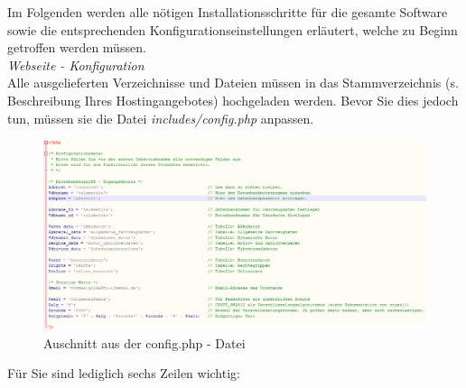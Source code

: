 \documentclass[fontsize = 12pt, paper = a4]{scrreprt}
\begin{document}
Im Folgenden werden alle nötigen Installationsschritte für die gesamte Software sowie die entsprechenden Konfigurationseinstellungen erläutert, welche zu Beginn getroffen werden müssen. \\

\textit{Webseite - Konfiguration} \\

Alle ausgelieferten Verzeichnisse und Dateien müssen in das Stammverzeichnis (s. Beschreibung Ihres Hostingangebotes) hochgeladen werden. Bevor Sie dies jedoch tun, müssen sie die Datei \textit{includes/config.php} anpassen. \\ 

\begin{figure}[h]
\centering
\includegraphics[scale = 0.50]{website_config}
\caption[Auschnitt aus der config.php - Datei]{Auschnitt aus der config.php - Datei}
\label{websiteconfig}
\end{figure} 

\newpage

Für Sie sind lediglich sechs Zeilen wichtig: 
\end{document}
